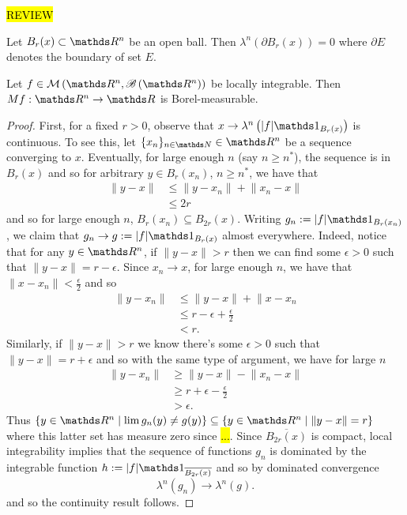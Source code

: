 \hl{REVIEW}
\begin{lem}
	\label{lem:ballBoundaryMeasureZero} Let $B_r(x) \subset \R^n$ be an open ball. Then $\lambda^n \left(\partial B_r(x) \right) = 0$ where $\partial E$ denotes the boundary of set $E$.
\end{lem}
\begin{prop}
    \label{prop:maximalFunctionMeasurable} Let $f \in \mathcal{M}\left(\R^n, \borel \left( \R^n \right) \right) $ be locally integrable. Then
    $Mf:\R^n \to \R $ is Borel-measurable.
\end{prop}
\begin{proof}
    First, for a fixed $r>0$, observe that $x \to \lambda^n \left(\lvert f \rvert \indicate_{B_r(x)} \right)$ is continuous. To see this, let $\{x_n\}_{n \in \N} \in \R^n$ be a sequence
    converging to $x$.  Eventually, for large enough $n$ (say $n\geq n^*$), the sequence is in $B_r(x)$ and so for arbitrary $y \in B_r(x_n)$, $n \geq n^*$, we have that
    \begin{align*}
        \lVert y - x \rVert &\leq \lVert y - x_{n} \rVert + \lVert x_{n} - x \rVert  \\
        & \leq 2r 
    \end{align*}
    and so for large enough $n$, $B_r(x_n) \subseteq  B_{2r}(x)$. Writing $g_n := \lvert f \rvert \indicate_{B_r(x_n)}$, we claim that $g_n \to g:= \lvert f \rvert \indicate_{B_r(x)}$ almost everywhere. Indeed, notice that for any $y \in \R^n$, if $\lVert y - x\rVert > r$ then we can find some $\epsilon > 0$ such that $\lVert y - x \rVert = r - \epsilon$. Since $x_n \to x$, for large enough $n$, we have that $\lVert x - x_n \rVert < \frac{\epsilon}{2}$ and so 
    \begin{align*}
    	\lVert y - x_n \rVert &\leq \lVert y -x \rVert + \lVert x - x_n \\
    	&\leq r - \epsilon + \frac{\epsilon}{2}\\
    	&< r.
    \end{align*}
    Similarly, if $\lVert y - x \rVert > r$ we know there's some $\epsilon > 0$ such that $\lVert y - x \rVert = r + \epsilon$ and so with the same type of argument, we have for large $n$
    \begin{align*}
    	\lVert y - x_n \rVert &\geq \lVert y - x\rVert - \lVert x_n - x \rVert \\
    	&\geq r + \epsilon - \frac{\epsilon}{2} \\
    	&> \epsilon.
    \end{align*}
    Thus $\{ y \in \R^n \mid \lim g_n(y) \neq g(y)\} \subseteq \{y \in \R^n \mid \lVert y - x \rVert = r\}$ where this latter set has measure zero since \hl{...}. Since $\overline{B_{2r}(x)}$ is compact, local integrability implies that the sequence of functions $g_n$ is dominated by the integrable function $h := \lvert f \rvert \indicate_{\overline{B_{2r}(x)}}$ and so by dominated convergence 
    \[
    	\lambda^n \left(g_n\right) \to \lambda^n \left(g\right).
    \]
    and so the continuity result follows.
    

\end{proof}
